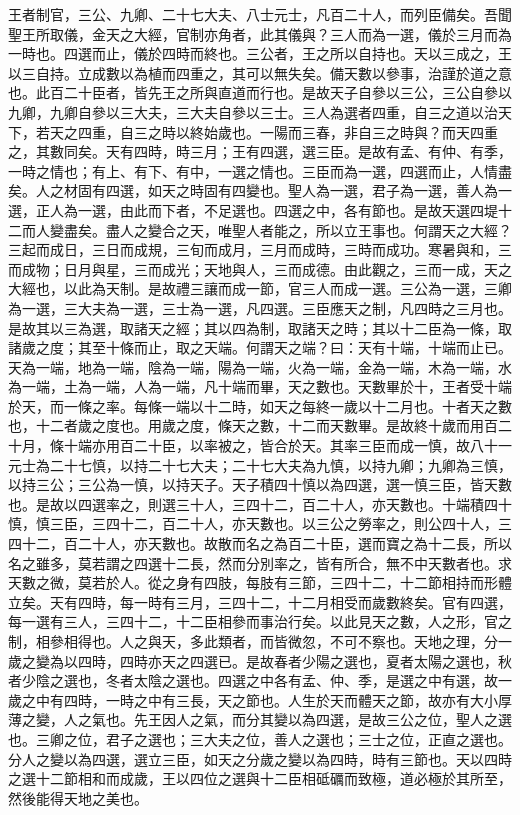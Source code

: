 
王者制官，三公、九卿、二十七大夫、八士元士，凡百二十人，而列臣備矣。吾聞聖王所取儀，金天之大經，官制亦角者，此其儀與？三人而為一選，儀於三月而為一時也。四選而止，儀於四時而終也。三公者，王之所以自持也。天以三成之，王以三自持。立成數以為植而四重之，其可以無失矣。備天數以參事，治謹於道之意也。此百二十臣者，皆先王之所與直道而行也。是故天子自參以三公，三公自參以九卿，九卿自參以三大夫，三大夫自參以三士。三人為選者四重，自三之道以治天下，若天之四重，自三之時以終始歲也。一陽而三春，非自三之時與？而天四重之，其數同矣。天有四時，時三月；王有四選，選三臣。是故有孟、有仲、有季，一時之情也；有上、有下、有中，一選之情也。三臣而為一選，四選而止，人情盡矣。人之材固有四選，如天之時固有四變也。聖人為一選，君子為一選，善人為一選，正人為一選，由此而下者，不足選也。四選之中，各有節也。是故天選四堤十二而人變盡矣。盡人之變合之天，唯聖人者能之，所以立王事也。何謂天之大經？三起而成日，三日而成規，三旬而成月，三月而成時，三時而成功。寒暑與和，三而成物；日月與星，三而成光；天地與人，三而成德。由此觀之，三而一成，天之大經也，以此為天制。是故禮三讓而成一節，官三人而成一選。三公為一選，三卿為一選，三大夫為一選，三士為一選，凡四選。三臣應天之制，凡四時之三月也。是故其以三為選，取諸天之經；其以四為制，取諸天之時；其以十二臣為一條，取諸歲之度；其至十條而止，取之天端。何謂天之端？曰：天有十端，十端而止已。天為一端，地為一端，陰為一端，陽為一端，火為一端，金為一端，木為一端，水為一端，土為一端，人為一端，凡十端而畢，天之數也。天數畢於十，王者受十端於天，而一條之率。每條一端以十二時，如天之每終一歲以十二月也。十者天之數也，十二者歲之度也。用歲之度，條天之數，十二而天數畢。是故終十歲而用百二十月，條十端亦用百二十臣，以率被之，皆合於天。其率三臣而成一慎，故八十一元士為二十七慎，以持二十七大夫；二十七大夫為九慎，以持九卿；九卿為三慎，以持三公；三公為一慎，以持天子。天子積四十慎以為四選，選一慎三臣，皆天數也。是故以四選率之，則選三十人，三四十二，百二十人，亦天數也。十端積四十慎，慎三臣，三四十二，百二十人，亦天數也。以三公之勞率之，則公四十人，三四十二，百二十人，亦天數也。故散而名之為百二十臣，選而寶之為十二長，所以名之雖多，莫若謂之四選十二長，然而分別率之，皆有所合，無不中天數者也。求天數之微，莫若於人。從之身有四肢，每肢有三節，三四十二，十二節相持而形體立矣。天有四時，每一時有三月，三四十二，十二月相受而歲數終矣。官有四選，每一選有三人，三四十二，十二臣相參而事治行矣。以此見天之數，人之形，官之制，相參相得也。人之與天，多此類者，而皆微忽，不可不察也。天地之理，分一歲之變為以四時，四時亦天之四選已。是故春者少陽之選也，夏者太陽之選也，秋者少陰之選也，冬者太陰之選也。四選之中各有孟、仲、季，是選之中有選，故一歲之中有四時，一時之中有三長，天之節也。人生於天而體天之節，故亦有大小厚薄之變，人之氣也。先王因人之氣，而分其變以為四選，是故三公之位，聖人之選也。三卿之位，君子之選也；三大夫之位，善人之選也；三士之位，正直之選也。分人之變以為四選，選立三臣，如天之分歲之變以為四時，時有三節也。天以四時之選十二節相和而成歲，王以四位之選與十二臣相砥礪而致極，道必極於其所至，然後能得天地之美也。

